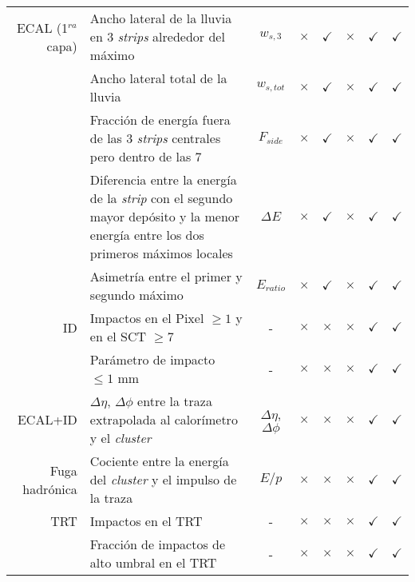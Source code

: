 \begin{table}
\begin{threeparttable}
\begin{tabular}{ r p{8cm} c | c c | c c c }
	ECAL (1$^{ra}$ capa) & Ancho lateral de la lluvia en 3 \textit{strips} alrededor del máximo & $w_{s,3}$ & $\times$ & $\checkmark$ & $\times$ & $\checkmark$ & $\checkmark$ \\

		& Ancho lateral total de la lluvia & $w_{s,tot}$ & $\times$ & $\checkmark$ & $\times$ & $\checkmark$ & $\checkmark$ \\

		& Fracción de energía fuera de las 3 \textit{strips} centrales pero dentro de las 7 & $F_{side}$ & $\times$ & $\checkmark$ & $\times$ & $\checkmark$ & $\checkmark$ \\

		& Diferencia entre la energía de la \textit{strip} con el segundo mayor depósito y la menor energía entre los dos primeros máximos locales & $\Delta E$ & $\times$ & $\checkmark$ & $\times$ & $\checkmark$ & $\checkmark$ \\

		& Asimetría entre el primer y segundo máximo & $E_{ratio}$ & $\times$ & $\checkmark$ & $\times$ & $\checkmark$ & $\checkmark$ \\

	ID & Impactos en el Pixel $\ge 1$ y en el SCT $\ge 7$ & - & $\times$ & $\times$ & $\times$ & $\checkmark$ & $\checkmark$ \\

		& Parámetro de impacto $\le 1$ mm & - & $\times$ & $\times$ & $\times$ & $\checkmark$ & $\checkmark$ \\

	ECAL+ID & $\Delta\eta$, $\Delta\phi$ entre la traza extrapolada al calorímetro y el \textit{cluster} & $\Delta\eta$, $\Delta\phi$ & $\times$ & $\times$ & $\times$ & $\checkmark$ & $\checkmark$ \\

	Fuga hadrónica & Cociente entre la energía del \textit{cluster} y el impulso de la traza & $E/p$ & $\times$ & $\times$ & $\times$ & $\checkmark$ & $\checkmark$ \\

	TRT & Impactos en el TRT & - & $\times$ & $\times$ & $\times$ & $\checkmark$ & $\checkmark$ \\

		& Fracción de impactos de alto umbral en el TRT & - & $\times$ & $\times$ & $\times$ & $\checkmark$ & $\checkmark$ \\

	\hline

\end{tabular}
\end{threeparttable}
\label{lmttable}
\end{table}
\renewcommand{\arraystretch}{1}




